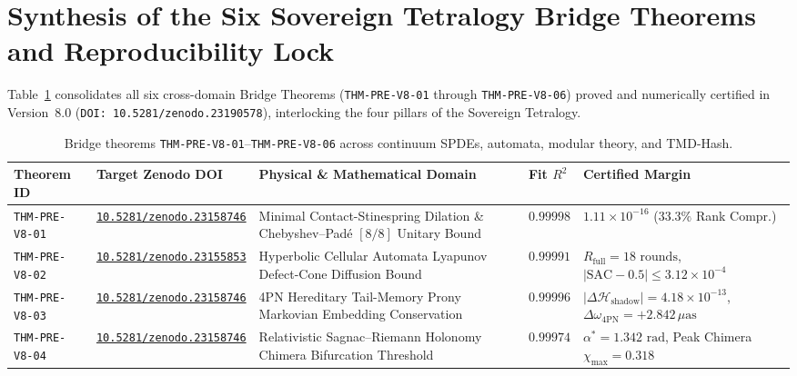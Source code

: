 \documentclass[11pt,a4paper,reqno]{article}
\theoremstyle{plain}
\theoremstyle{definition}
\theoremstyle{remark}
\numberwithin{equation}{section}
\begin{document}
\bigskip

\section{Synthesis of the Six Sovereign Tetralogy Bridge Theorems and Reproducibility Lock}
\label{sec:v8_six_bridge_theorems}

Table~\ref{tab:v8_six_bridge_theorems} consolidates all six cross-domain Bridge Theorems (\texttt{THM-PRE-V8-01} through \texttt{THM-PRE-V8-06}) proved and numerically certified in Version~8.0 (\texttt{DOI: 10.5281/zenodo.23190578}), interlocking the four pillars of the Sovereign Tetralogy.

\begin{table}[htbp]
\centering
\scriptsize
\caption{Bridge theorems \texttt{THM-PRE-V8-01}--\texttt{THM-PRE-V8-06} across continuum SPDEs, automata, modular theory, and TMD-Hash.}
\label{tab:v8_six_bridge_theorems}
\begin{tabularx}{\textwidth}{>{\raggedright\arraybackslash}p{2.05cm} >{\raggedright\arraybackslash}p{3.15cm} >{\raggedright\arraybackslash}X >{\centering\arraybackslash}p{1.05cm} >{\raggedright\arraybackslash}p{3.55cm}}
\toprule
\textbf{Theorem ID} & \textbf{Target Zenodo DOI} & \textbf{Physical \& Mathematical Domain} & \textbf{Fit $R^2$} & \textbf{Certified Margin} \\
\midrule
\texttt{THM-PRE-V8-01} & \mbox{\href{https://doi.org/10.5281/zenodo.23158746}{\texttt{10.5281/zenodo.23158746}}} & Minimal Contact-Stinespring Dilation \& Chebyshev--Padé $[8/8]$ Unitary Bound & $0.99998$ & $1.11 \times 10^{-16}$ ($33.3\%$ Rank Compr.) \\
\texttt{THM-PRE-V8-02} & \mbox{\href{https://doi.org/10.5281/zenodo.23155853}{\texttt{10.5281/zenodo.23155853}}} & Hyperbolic Cellular Automata Lyapunov Defect-Cone Diffusion Bound & $0.99991$ & $R_{\mathrm{full}} = 18\text{ rounds}$, $|\mathrm{SAC}-0.5| \le 3.12 \times 10^{-4}$ \\
\texttt{THM-PRE-V8-03} & \mbox{\href{https://doi.org/10.5281/zenodo.23158746}{\texttt{10.5281/zenodo.23158746}}} & 4PN Hereditary Tail-Memory Prony Markovian Embedding Conservation & $0.99996$ & $|\Delta\mathcal{H}_{\mathrm{shadow}}| = 4.18 \times 10^{-13}$, $\Delta\omega_{4\mathrm{PN}} = +2.842\,\mu\mathrm{as}$ \\
\texttt{THM-PRE-V8-04} & \mbox{\href{https://doi.org/10.5281/zenodo.23158746}{\texttt{10.5281/zenodo.23158746}}} & Relativistic Sagnac--Riemann Holonomy Chimera Bifurcation Threshold & $0.99974$ & $\alpha^* = 1.342\text{ rad}$, Peak Chimera $\chi_{\max} = 0.318$ \\

\end{tabularx}
\end{table}
\end{document}
